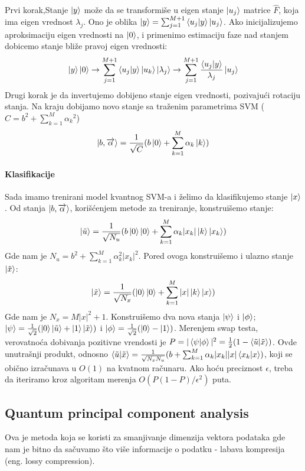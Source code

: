 \documentclass[12pt, letterpaper, oneside]{article}
\begin{document}
Prvi korak,Stanje $\Ket{y}$ može da se transformiše u eigen stanje $\Ket{u_j}$ matrice $\hat{F}$, koja ima eigen vrednost $\lambda_j$.
Ono je oblika $\Ket{y} = \sum_{j=1}^{M+1}\braket{u_j|y}\Ket{u_j}$. Ako inicijalizujemo aproksimaciju eigen vrednosti na $\Ket{0}$, i primenimo 
estimaciju faze nad stanjem dobicemo stanje bliže pravoj eigen vrednosti:
\[
  \Ket{y}\Ket{0} \to \sum_{j=1}^{M+1}\braket{u_j|y}\Ket{u_k}\Ket{\lambda_j} \to \sum_{j=1}^{M+1}\frac{\braket{u_j|y}}{\lambda_j}\Ket{u_j}
\]
Drugi korak je da invertujemo dobijeno stanje eigen vrednosti, pozivajući rotaciju stanja. Na kraju dobijamo novo stanje sa traženim parametrima SVM ($C = b^2 + \sum_{k=1}^M{\alpha_k}^2$)
\[
    \Ket{b,\overrightarrow{\alpha}} = \frac{1}{\sqrt{C}}(b\Ket{0}+ \sum_{k=1}^M{\alpha_k \Ket{k}})
\]

\paragraph*{Klasifikacije}
Sada imamo trenirani model kvantnog SVM-a i želimo da klasifikujemo stanje $\Ket{x}$. Od stanja $\Ket{b,\overrightarrow{\alpha}}$, korišćenjem metode za treniranje, konstruišemo stanje:
\[
    \Ket{\tilde{u}} = \frac{1}{\sqrt{N_u}}(b\Ket{0}\Ket{0} + \sum_{k=1}^M{\alpha_k |x_k| \Ket{k}\Ket{x_k}})
\]
Gde nam je $N_u=b^2+\sum_{k=1}^M{\alpha_k^2 |x_k|^2}$. Pored ovoga konstruišemo i ulazno stanje $\Ket{\tilde{x}}$:
\[
    \Ket{\tilde{x}} = \frac{1}{\sqrt{N_x}}(\Ket{0}\Ket{0} + \sum_{k=1}^M{|x|\Ket{k}\Ket{x}})
\]
Gde nam je $N_x=M|x|^2 + 1$. Konstruišemo dva nova stanja $\Ket{\psi}$ i $\Ket{\phi}$; $\Ket{\psi}=\frac{1}{\sqrt{2}}(\Ket{0}\Ket{\tilde{u}}+\Ket{1}\Ket{\tilde{x}})$ i
$\Ket{\phi} = \frac{1}{\sqrt{2}}(\Ket{0}-\Ket{1})$. Merenjem swap testa, verovatnoća dobivanja pozitivne vrendosti je $P=|\braket{\psi|\phi}|^2=\frac{1}{2}(1-\braket{\tilde{u}|\tilde{x}})$. 
Ovde unutrašnji produkt, odnosno $\braket{\tilde{u}|\tilde{x}} = \frac{1}{\sqrt{N_xN_u}}(b+\sum_{k=1}^M{\alpha_k |x_k||x|\braket{x_k|x}})$, koji se obično izračunava u $O(1)$ na kvatnom računaru.
Ako hoću preciznost $\epsilon$, treba da iteriramo kroz algoritam merenja $O(P(1-P)/\epsilon^2)$ puta. \cite{rebentrost2014quantum}

\subsection{Quantum principal component analysis}
Ova je metoda koja se koristi za smanjivanje dimenzija vektora podataka gde nam je bitno da sačuvamo što više informacije o podatku - labava kompresija (eng. lossy compression). 
\end{document}
